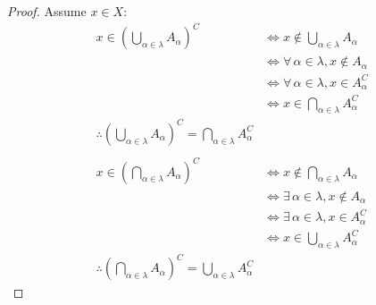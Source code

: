 \documentclass[letterpaper,12pt,fleqn]{article}
\renewcommand{\a}{\alpha}
\renewcommand{\l}{\lambda}
\begin{document}
\begin{proof}
  Assume \(x\in X\):
  \begin{align*}
    x\in\left(\bigcup_{\a\in\l}A_{\a}\right)^C &\iff x\notin\bigcup_{\a\in\l}A_{\a} \\
    &\iff \forall\,\a\in\l,x\notin A_{\a} \\
    &\iff \forall\,\a\in\l,x\in A_{\a}^C \\
    &\iff x\in\bigcap_{\a\in\l}A_{\a}^C \\
    \therefore\left(\bigcup_{\a\in\l}A_{\a}\right)^C=\bigcap_{\a\in\l}A_{\a}^C \\
    \\
    x\in\left(\bigcap_{\a\in\l}A_{\a}\right)^C &\iff x\notin\bigcap_{\a\in\l}A_{\a} \\
    &\iff \exists\,\a\in\l,x\notin A_{\a} \\
    &\iff \exists\,\a\in\l,x\in A_{\a}^C \\
    &\iff x\in\bigcup_{\a\in\l}A_{\a}^C \\
    \therefore\left(\bigcap_{\a\in\l}A_{\a}\right)^C=\bigcup_{\a\in\l}A_{\a}^C
  \end{align*}
\end{proof}
\end{document}
